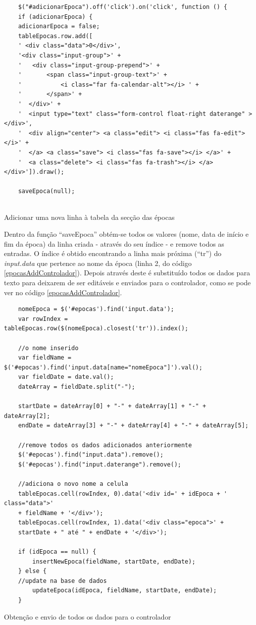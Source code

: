 \documentclass[12pt, twoside]{report}
\begin{document}
	\begin{listing}[H]
	\begin{verbatim}
	$("#adicionarEpoca").off('click').on('click', function () {
	if (adicionarEpoca) {
	adicionarEpoca = false;
	tableEpocas.row.add([
	' <div class="data">0</div>',
	'<div class="input-group">' +
	'   <div class="input-group-prepend">' +
	'       <span class="input-group-text">' +
	'           <i class="far fa-calendar-alt"></i> ' +
	'       </span>' +
	'  </div>' +
	'  <input type="text" class="form-control float-right daterange" > </div>',
	'  <div align="center"> <a class="edit"> <i class="fas fa-edit"> </i>' +
	'  </a> <a class="save"> <i class="fas fa-save"></i> </a>' +
	'  <a class="delete"> <i class="fas fa-trash"></i> </a></div>']).draw();
	
	saveEpoca(null);
					
	\end{verbatim}
	\caption{Adicionar uma nova linha à tabela da secção das épocas}
	\label{epocasAddDatable}
	\end{listing}
	
	Dentro da função ``saveEpoca'' obtém-se todos os valores (nome, data de início e fim da época) da linha criada - através do seu índice - e remove todos as entradas. O índice é obtido encontrando a linha mais próxima (``tr'') do \textit{input.data} que pertence ao nome da época (linha 2, do código \ref{epocasAddControlador}). Depois através deste é substituído todos os dados para texto para deixarem de ser editáveis e enviados para o controlador, como se pode ver no código \ref{epocasAddControlador}.
 	
	\begin{listing}[H]
	\begin{verbatim}
	nomeEpoca = $('#epocas').find('input.data');
	var rowIndex = tableEpocas.row($(nomeEpoca).closest('tr')).index();
		
	//o nome inserido
	var fieldName = $('#epocas').find('input.data[name="nomeEpoca"]').val();
	var fieldDate = date.val();
	dateArray = fieldDate.split("-");
			
	startDate = dateArray[0] + "-" + dateArray[1] + "-" + dateArray[2];
	endDate = dateArray[3] + "-" + dateArray[4] + "-" + dateArray[5];
	
	//remove todos os dados adicionados anteriormente
	$('#epocas').find("input.data").remove();
	$('#epocas').find("input.daterange").remove();
			
	//adiciona o novo nome a celula
	tableEpocas.cell(rowIndex, 0).data('<div id=' + idEpoca + ' class="data">' 
	+ fieldName + '</div>');
	tableEpocas.cell(rowIndex, 1).data('<div class="epoca">' + 
	startDate + " até " + endDate + '</div>');
		
	if (idEpoca == null) {
		insertNewEpoca(fieldName, startDate, endDate);
	} else {
	//update na base de dados
		updateEpoca(idEpoca, fieldName, startDate, endDate);
	}
	\end{verbatim}
	\caption{Obtenção e envio de todos os dados para o controlador}
	\label{epocasAddControlador}
	\end{listing}
\end{document}
